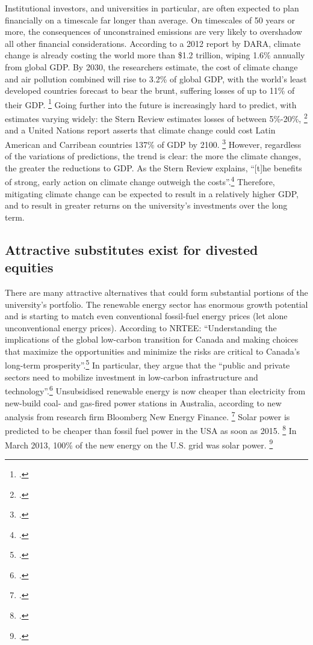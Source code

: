 Institutional investors, and universities in particular, are often expected to plan financially on a timescale far longer than average. 
On timescales of 50 years or more, the consequences of unconstrained emissions are very likely to overshadow all other financial considerations.
According to a 2012 report by DARA, climate change is already costing the world more than \$1.2 trillion, wiping 1.6\% annually from global GDP.
By 2030, the researchers estimate, the cost of climate change and air pollution combined will rise to 3.2\% of global GDP, with the world's least developed countries forecast to bear the brunt, suffering losses of up to 11\% of their GDP. \footcite{DARACVM}
Going further into the future is increasingly hard to predict, with estimates varying widely: the Stern Review estimates losses of between 5\%-20\%, \footcite{Stern2007} and a United Nations report asserts that climate change could cost Latin American and Carribean countries 137\% of GDP by 2100. \footcite{CCLatinAmerica}
However, regardless of the variations of predictions, the trend is clear: the more the climate changes, the greater the reductions to GDP.
As the Stern Review explains, ``[t]he benefits of strong, early action on climate change outweigh the costs''.\footcite[][Executive summary at: \url{http://www.hm-treasury.gov.uk/d/Executive_Summary.pdf}]{Stern2007}
Therefore, mitigating climate change can be expected to result in a relatively higher GDP, and to result in greater returns on the university's investments over the long term.



	\subsection {Attractive substitutes exist for divested equities}



There are many attractive alternatives that could form substantial portions of the university's portfolio.
The renewable energy sector has enormous growth potential and is starting to match even conventional fossil-fuel energy prices (let alone unconventional energy prices).
According to NRTEE: ``Understanding the implications of the global low-carbon transition for Canada and making choices that maximize the opportunities and minimize the risks are critical to Canada's long-term prosperity''.\footcite[][p. 15]{FramingFuture}
In particular, they argue that the ``public and private sectors need to mobilize investment in low-carbon infrastructure and technology''.\footcite[][p. 17]{FramingFuture}
Unsubsidised renewable energy is now cheaper than electricity from new-build coal- and gas-fired power stations in Australia, according to new analysis from research firm Bloomberg New Energy Finance. \footcite{BlombergAussieWind}
Solar power is predicted to be cheaper than fossil fuel power in the USA as soon as 2015. \footcite{GlobalDataSolar}
In March 2013, 100\% of the new energy on the U.S. grid was solar power. \footcite{SmartPlanetSolar100}



